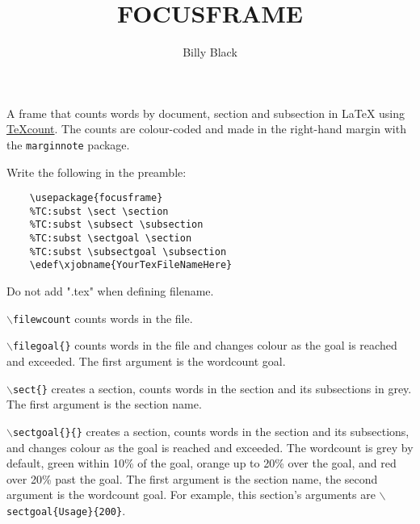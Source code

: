 \documentclass{article}
\title{FOCUSFRAME}
\author{Billy Black}
\edef\xjobname{focusframe}
\begin{document}
\maketitle

{}

A frame that counts words by document, section and subsection in LaTeX using \href{https://app.uio.no/ifi/texcount/}{TeXcount}. The counts are colour-coded and made in the right-hand margin with the \texttt{marginnote} package.


Write the following in the preamble: 

\begin{verbatim}
    \usepackage{focusframe}
    %TC:subst \sect \section
    %TC:subst \subsect \subsection
    %TC:subst \sectgoal \section
    %TC:subst \subsectgoal \subsection
    \edef\xjobname{YourTexFileNameHere}
\end{verbatim}

Do not add ".tex" when defining filename.

\texttt{$\backslash$filewcount} counts words in the file.

\texttt{$\backslash$filegoal\{\}} counts words in the file and changes colour as the goal is reached and exceeded. The first argument is the wordcount goal.

\texttt{$\backslash$sect\{\}} creates a section, counts words in the section and its subsections in grey. The first argument is the section name.

\texttt{$\backslash$sectgoal\{\}\{\}} creates a section, counts words in the section and its subsections, and changes colour as the goal is reached and exceeded. The wordcount is grey by default, green within 10\% of the goal, orange up to 20\% over the goal, and red over 20\% past the goal. The first argument is the section name, the second argument is the wordcount goal. For example, this section's arguments are \texttt{$\backslash$sectgoal\{Usage\}\{200\}}.
\end{document}
